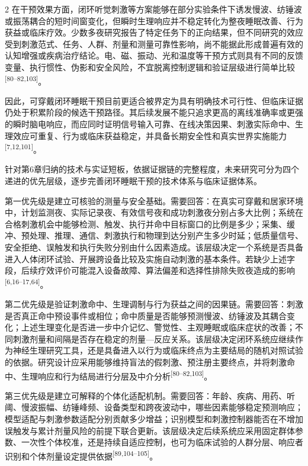 \documentclass[UTF8,zihao=5,fontset=none]{ctexart}
\newcommand{\hei}{\CJKfamily{hei}}
\newcommand{\leveltwo}[1]{%
  \par\noindent{\hei\fontsize{10.5pt}{15.6pt}\selectfont\bfseries #1\par}}
\newcommand{\refcite}[1]{\nolinebreak[4]\textsuperscript{[#1]}}
\begin{document}
\begin{multicols}{2}
在干预效果方面，闭环听觉刺激等方案能够在部分实验条件下诱发慢波、纺锤波或振荡耦合的短时间窗变化，但瞬时生理响应并不稳定转化为整夜睡眠改善、行为获益或临床疗效。少数多夜研究报告了特定任务下的正向结果，但不同研究的效应受到刺激范式、任务、人群、剂量和测量可靠性影响，尚不能据此形成普遍有效的认知增强或疾病治疗结论。电、磁、振动、光和温度等干预方式则具有不同的反馈变量、执行惯性、伪影和安全风险，不宜脱离控制逻辑和验证层级进行简单比较\refcite{80--82,103}。\par

因此，可穿戴闭环睡眠干预目前更适合被界定为具有明确技术可行性、但临床证据仍处于积累阶段的候选干预路径。其后续发展不能只追求更高的离线准确率或更强的瞬时脑电响应，而应同时证明信号输入可靠、在线决策因果、刺激实际命中、生理效应可重复、行为或临床获益稳定，并具备长期安全性和真实世界实施能力\refcite{7,12,101}。\par

\leveltwo{7.2 优先研究问题及决策意义}

针对第6章归纳的技术与实证短板，依据证据链的完整程度，未来研究可分为四个递进的优先层级，逐步完善闭环睡眠干预的技术体系与临床证据体系。\par

第一优先级是建立可核验的测量与安全基础。需要回答：在真实可穿戴和居家环境中，计划监测夜、实际记录夜、有效信号夜和成功刺激夜分别占多大比例；系统在合格刺激机会中能够检测、触发、执行并命中目标窗口的比例是多少；采集、缓冲、预处理、推理、通信、刺激执行和物理到达分别产生多少时延；低质量信号、安全拒绝、误触发和执行失败分别由什么因素造成。该层级决定一个系统是否具备进入人体闭环试验、开展跨设备比较及实施自动刺激的基本条件。若缺少上述字段，后续疗效评价可能混入设备故障、算法偏差和选择性排除失败夜造成的影响\refcite{6,16--17,64}。\par

第二优先级是验证刺激命中、生理调制与行为获益之间的因果链。需要回答：刺激是否真正命中预设事件或相位；命中质量是否能够预测慢波、纺锤波及其耦合变化；上述生理变化是否进一步中介记忆、警觉性、主观睡眠或临床症状的改善；不同刺激剂量和间隔是否存在稳定的剂量—反应关系。该层级决定闭环系统应继续作为神经生理研究工具，还是具备进入以行为或临床终点为主要结局的随机对照试验的依据。研究设计应采用能够维持盲法的假刺激、预注册主要终点，并将刺激命中、生理响应和行为结局进行分层及中介分析\refcite{80--82,103}。\par

第三优先级是建立可解释的个体化适配机制。需要回答：年龄、疾病、用药、听阈、慢波振幅、纺锤峰频、设备类型和跨夜波动中，哪些因素能够稳定预测响应；模型适配与刺激参数适配分别贡献多少增益；识别模型和刺激控制器能否在不增加误触发与累计剂量风险的前提下联合更新。该层级决定后续系统应采用固定群体参数、一次性个体校准，还是持续自适应控制，也可为临床试验的人群分层、响应者识别和个体剂量设定提供依据\refcite{89,104--105}。\par


\end{multicols}
\end{document}
